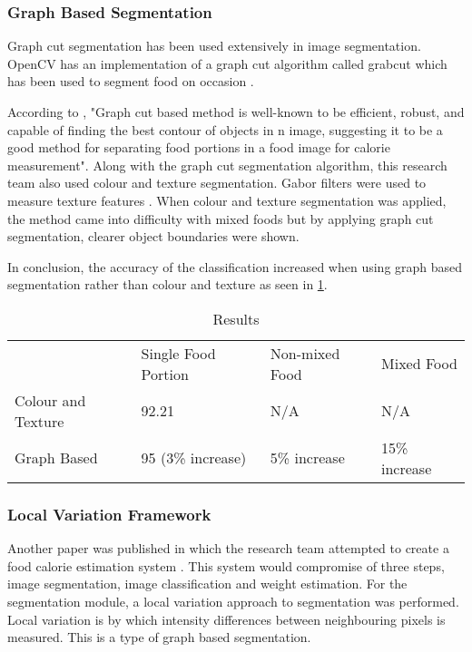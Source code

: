 \tocless\subsubsection{Graph Based Segmentation}
Graph cut segmentation has been used extensively  in image segmentation. OpenCV
has an implementation of a graph cut algorithm called grabcut which has been
used to segment food on occasion \parencite{graphCut}. 

According to \parencite{graphCut}, "Graph cut based method is well-known to be
efficient, robust, and capable of finding the best contour of objects in n
image, suggesting it to be a good method for separating food portions in a food
image for calorie measurement". Along with the graph cut segmentation algorithm,
this research team also used colour and texture segmentation. Gabor filters were
used to measure texture features \parencite{graphCut}. When colour and texture
segmentation was applied, the method came into difficulty with mixed foods but
by applying graph cut segmentation, clearer object boundaries were shown.

In conclusion, the accuracy of the classification increased when using graph
based segmentation rather than colour and texture as seen in \ref{graphCT}.

\begin{table}[]
	\centering
	\caption{Results}
	\label{graphCT}
	\begin{tabular}{llll}
		                  & Single Food Portion & Non-mixed Food & Mixed Food
						  \\
						  Colour and Texture & 92.21               & N/A
						  & N/A           \\
						  Graph Based       & 95 (3\% increase)   & 5\% increase
						  & 15\% increase
	\end{tabular}
\end{table}

\tocless\subsubsection{Local Variation Framework}
Another paper was published in which the research team attempted to create a
food calorie estimation system \parencite{foodImageAnalysis}. This system would
compromise of three steps, image segmentation, image classification and weight
estimation. For the segmentation module, a local variation approach to
segmentation was performed. Local variation is by which intensity differences
between neighbouring pixels is measured. This is a type of graph based
segmentation.

